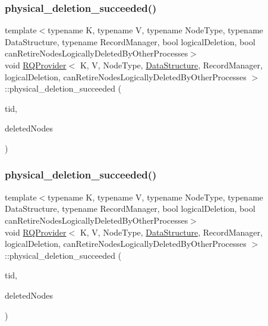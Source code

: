 \mbox{\label{classRQProvider_a1bcce8dc80c1661b549a5ec6f9ee6d15}} 
\subsubsection{\texorpdfstring{physical\+\_\+deletion\+\_\+succeeded()}{physical\_deletion\_succeeded()}\hspace{0.1cm}{\footnotesize\ttfamily [1/5]}}
{\footnotesize\ttfamily template$<$typename K, typename V, typename Node\+Type, typename Data\+Structure, typename Record\+Manager, bool logical\+Deletion, bool can\+Retire\+Nodes\+Logically\+Deleted\+By\+Other\+Processes$>$ \\
void \hyperlink{classRQProvider}{R\+Q\+Provider}$<$ K, V, Node\+Type, \hyperlink{classDataStructure}{Data\+Structure}, Record\+Manager, logical\+Deletion, can\+Retire\+Nodes\+Logically\+Deleted\+By\+Other\+Processes $>$\+::physical\+\_\+deletion\+\_\+succeeded (\begin{DoxyParamCaption}\item[{const int}]{tid,  }\item[{Node\+Type $\ast$const $\ast$const}]{deleted\+Nodes }\end{DoxyParamCaption})\hspace{0.3cm}{\ttfamily [inline]}}

\mbox{\label{classRQProvider_a1bcce8dc80c1661b549a5ec6f9ee6d15}} 
\subsubsection{\texorpdfstring{physical\+\_\+deletion\+\_\+succeeded()}{physical\_deletion\_succeeded()}\hspace{0.1cm}{\footnotesize\ttfamily [2/5]}}
{\footnotesize\ttfamily template$<$typename K, typename V, typename Node\+Type, typename Data\+Structure, typename Record\+Manager, bool logical\+Deletion, bool can\+Retire\+Nodes\+Logically\+Deleted\+By\+Other\+Processes$>$ \\
void \hyperlink{classRQProvider}{R\+Q\+Provider}$<$ K, V, Node\+Type, \hyperlink{classDataStructure}{Data\+Structure}, Record\+Manager, logical\+Deletion, can\+Retire\+Nodes\+Logically\+Deleted\+By\+Other\+Processes $>$\+::physical\+\_\+deletion\+\_\+succeeded (\begin{DoxyParamCaption}\item[{const int}]{tid,  }\item[{Node\+Type $\ast$const $\ast$const}]{deleted\+Nodes }\end{DoxyParamCaption})\hspace{0.3cm}{\ttfamily [inline]}}

